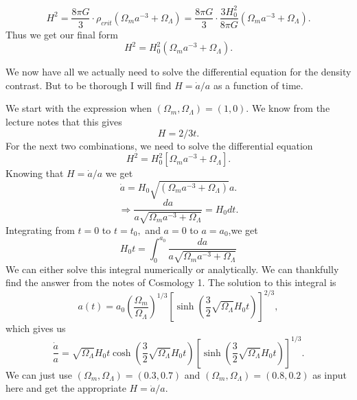\documentclass[a4paper,norsk, 10pt]{article}
\begin{document}
\begin{equation}
H^2 = \frac{8\pi G}{3}\cdot\rho_{crit}(\Omega_{m}a^{-3} + \Omega_{\Lambda}) = \frac{8\pi G}{3}\cdot\frac{3H_{0}^2}{8\pi G}(\Omega_{m}a^{-3} + \Omega_{\Lambda}).
\end{equation}
Thus we get our final form
\begin{equation}
H^2 = H_0^2(\Omega_{m}a^{-3} + \Omega_{\Lambda}).
\end{equation}




We now have all we actually need to solve the differential equation for the density contrast. But to be thorough I will find $H=\dot{a}/a$ as a function of time.

We start with the expression when $(\Omega_{m},\Omega_{\Lambda}) = (1,0)$. We know from the lecture notes that this gives
\begin{equation}\label{eq:o_m=1}
H = 2/3t.
\end{equation}
For the next two combinations, we need to solve the differential equation
\begin{equation}\label{eq:H^2}
H^2 = H_0^2\left[{\Omega_{m}}{a^{-3}} + \Omega_{\Lambda}\right].
\end{equation}
Knowing that $H=\dot{a}/a$ we get
\begin{equation}\label{eq:a_dot}
\dot{a} = H_0\sqrt{\left({\Omega_{m}}{a^{-3}} + \Omega_{\Lambda}\right)}a.
\end{equation}
\begin{equation}
\Rightarrow \frac{da}{a\sqrt{{\Omega_{m}}{a^{-3}} + \Omega_{\Lambda}}} = H_0dt.
\end{equation}
Integrating from $t = 0$ to $t=t_0,$ and $a=0$ to $a=a_0$,we get
\begin{equation}
H_0t =  \int_0^{a_0}\frac{da}{a\sqrt{{\Omega_{m}}{a^{-3}} + \Omega_{\Lambda}}}
\end{equation}
We can either solve this integral numerically or analytically. We can thankfully find the answer from the notes of Cosmology 1. The solution to this integral is
\begin{equation}
a(t) = a_0\left(\frac{\Omega_{m}}{\Omega_{\Lambda}}\right)^{1/3}\left[\sinh\left(\frac{3}{2}\sqrt{\Omega_{\Lambda}}H_0 t\right)\right]^{2/3},
\end{equation} 
which gives us
\begin{equation}\label{o_m<1}
\frac{\dot{a}}{a} = \sqrt{\Omega_{\Lambda}}H_0 t\cosh\left(\frac{3}{2}\sqrt{\Omega_{\Lambda}}H_0 t\right)\left[\sinh\left(\frac{3}{2}\sqrt{\Omega_{\Lambda}}H_0 t\right)\right]^{1/3}.
\end{equation}
We can just use $(\Omega_{m},\Omega_{\Lambda}) = (0.3,0.7)$ and $(\Omega_{m},\Omega_{\Lambda}) = (0.8,0.2)$ as input here and get the appropriate $H = \dot{a}/a$.
\end{document}
